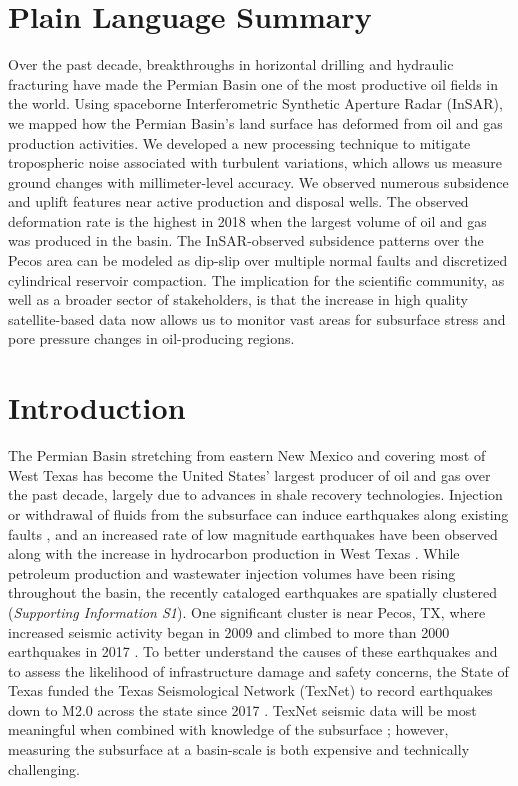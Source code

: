 \documentclass[draft]{agujournal2019}
\begin{document}
\section*{Plain Language Summary}
Over the past decade, breakthroughs in horizontal drilling and hydraulic fracturing have made the Permian Basin one of the most productive oil fields in the world. Using spaceborne Interferometric Synthetic Aperture Radar (InSAR), we mapped how the Permian Basin's land surface has deformed from oil and gas production activities. We developed a new processing technique to mitigate tropospheric noise associated with turbulent variations, which allows us measure ground changes with millimeter-level accuracy. We observed numerous subsidence and uplift features near active production and disposal wells. The observed deformation rate is the highest in 2018 when the largest volume of oil and gas was produced in the basin. The InSAR-observed subsidence patterns over the Pecos area can be modeled as dip-slip over multiple normal faults and discretized cylindrical reservoir compaction. The implication for the scientific community, as well as a broader sector of stakeholders, is that the increase in high quality satellite-based data now allows us to monitor vast areas for subsurface stress and pore pressure changes in oil-producing regions. 

\section{Introduction}
The Permian Basin stretching from eastern New Mexico and covering most of West Texas has become the United States' largest producer of oil and gas over the past decade, largely due to advances in shale recovery technologies. Injection or withdrawal of fluids from the subsurface can induce earthquakes along existing faults \cite{Ellsworth2013, simpson1988two}, and an increased rate of low magnitude earthquakes have been observed along with the increase in hydrocarbon production in West Texas \cite{Ellsworth2013, Frohlich2016historical, atkinson2016hydraulic, Frohlich2019, Lomax2019, savvaidis2020induced, skoumal2020induced}. While petroleum production and wastewater injection volumes have been rising throughout the basin, the recently cataloged earthquakes are spatially clustered (\textit{Supporting Information S1}). One significant cluster is near Pecos, TX, where increased seismic activity began in 2009 and climbed to more than 2000 earthquakes in 2017 \cite{Frohlich2019}. To better understand the causes of these earthquakes and to assess the likelihood of infrastructure damage and safety concerns, the State of Texas funded the Texas Seismological Network (TexNet) to record earthquakes down to M2.0 across the state since 2017 \cite{Savvaidis2019}. TexNet seismic data will be most meaningful when combined with knowledge of the subsurface \cite{academy2017environmental, CouncilInduced2013}; however, measuring the subsurface at a basin-scale is both expensive and technically challenging.
\end{document}
